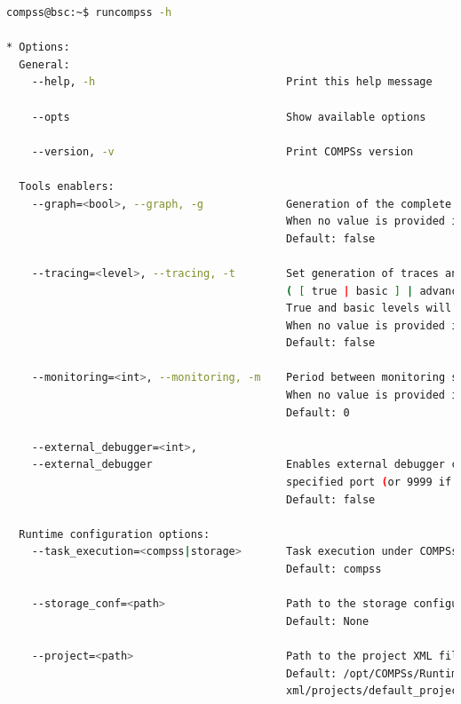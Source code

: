 \begin{lstlisting}[language=bash]
compss@bsc:~$ runcompss -h

* Options:
  General:
    --help, -h                              Print this help message

    --opts                                  Show available options

    --version, -v                           Print COMPSs version
    
  Tools enablers:
    --graph=<bool>, --graph, -g             Generation of the complete graph (true/false)
                                            When no value is provided it is set to true
                                            Default: false
                                            
    --tracing=<level>, --tracing, -t        Set generation of traces and/or tracing level
                                            ( [ true | basic ] | advanced | false)
                                            True and basic levels will produce the same traces.
                                            When no value is provided it is set to true
                                            Default: false
                                            
    --monitoring=<int>, --monitoring, -m    Period between monitoring samples (milliseconds)
                                            When no value is provided it is set to 2000
                                            Default: 0
                                            
    --external_debugger=<int>,
    --external_debugger                     Enables external debugger connection on the 
                                            specified port (or 9999 if empty)
                                            Default: false

  Runtime configuration options:
    --task_execution=<compss|storage>       Task execution under COMPSs or Storage.
                                            Default: compss
                                            
    --storage_conf=<path>                   Path to the storage configuration file
                                            Default: None
                                            
    --project=<path>                        Path to the project XML file
                                            Default: /opt/COMPSs/Runtime/configuration/
                                            xml/projects/default_project.xml
                                            

\end{lstlisting}
